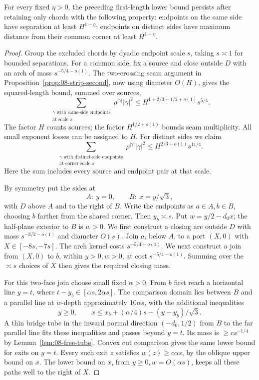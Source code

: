 \begin{lemma}
\label{lem:08-endpoint-separation}
For every fixed \(\eta>0\), the preceding first-length lower bound
persists after retaining only chords with the following property: endpoints
on the same side have separation at least \(H^{1-\eta}\); endpoints on
distinct sides have maximum distance from their common corner at least
\(H^{1-\eta}\).
\end{lemma}
\begin{proof}
Group the excluded chords by dyadic endpoint scale \(s\), taking
\(s\asymp1\) for bounded separations. For a common side, fix a source
and close outside \(D\) with an arch of mass
\(s^{-5/4-o(1)}\). The two-crossing seam argument in
Proposition~\ref{prop:08-strip-second}, now using diameter \(O(H)\),
gives the squared-length bound, summed over sources,
\[
 \sum_{\substack{\gamma\text{ with same-side endpoints}\\
                  \text{at scale }s}}
       \rho^{|\gamma|}|\gamma|^2
       \le H^{1+2/3+1/2+o(1)}s^{5/4}.
\]
The factor \(H\) counts sources; the factor \(H^{1/2+o(1)}\) bounds
seam multiplicity. All small exponent losses can be assigned to \(H\).
For distinct sides we claim
\begin{equation}
 \sum_{\substack{\gamma\text{ with distinct-side endpoints}\\
                  \text{at corner scale }s}}
       \rho^{|\gamma|}|\gamma|^2
       \le H^{2/3+o(1)}s^{11/4}.
 \label{eq:R-32b}
\end{equation}
Here the sum includes every source and endpoint pair at that scale.

By symmetry put the sides at
\[
 A:\ y=0,\qquad B:\ x=y/\sqrt3,
\]
with \(D\) above \(A\) and to the right of \(B\). Write the endpoints
as \(a\in A,b\in B\), choosing \(b\) farther from the shared corner.
Then \(y_b\asymp s\). Put \(w=y/2-d_0x\); the half-plane exterior
to \(B\) is \(w>0\). We first construct a closing arc outside \(D\)
with mass \(s^{-3/2-o(1)}\) and diameter \(O(s)\).
Join \(a\), below \(A\), to a port \((X,0)\) with
\(X\in[-8s,-7s]\). The arch kernel costs \(s^{-5/4-o(1)}\).
We next construct a join from \((X,0)\) to \(b\), within
\(y>0,w>0\), at cost \(s^{-5/4-o(1)}\). Summing over the
\(\asymp s\) choices of \(X\) then gives the required closing mass.

For this two-face join choose small fixed \(\alpha>0\). From \(b\)
first reach a horizontal line \(y=t\), where
\(t-y_b\in[\alpha s,2\alpha s]\). The comparison domain lies between
\(B\) and a parallel line at \(w\)-depth approximately \(10\alpha s\),
with the additional inequalities
\[
 y\ge0,\qquad
 x\le x_b+(\alpha/4)s-(y-y_b)/\sqrt3.
\]
A thin bridge tube in the inward normal direction \((-d_0,1/2)\)
from \(B\) to the far parallel line fits these inequalities and passes
beyond \(y=t\). Its mass is \(\ge cs^{-1/4}\) by
Lemma~\ref{lem:08-free-tube}. Convex cut comparison gives the same lower
bound for exits on \(y=t\). Every such exit \(z\) satisfies
\(w(z)\ge c\alpha s\), by the oblique upper bound on \(x\).
The lower bound on \(x\), from \(y\ge0,w=O(\alpha s)\), keeps all
these paths well to the right of \(X\).


\end{proof}
